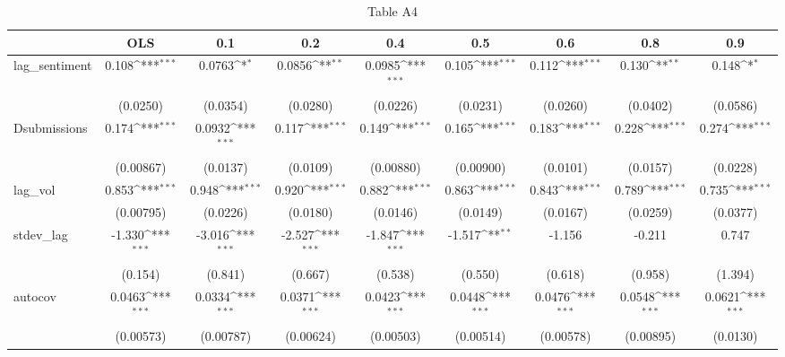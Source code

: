 \begin{table}[htbp]\centering
\def\sym#1{\ifmmode^{#1}\else\(^{#1}\)\fi}
\caption{Table A4}
\begin{tabular}{l*{8}{c}}
\toprule
                &\multicolumn{1}{c}{OLS}&\multicolumn{1}{c}{0.1}&\multicolumn{1}{c}{0.2}&\multicolumn{1}{c}{0.4}&\multicolumn{1}{c}{0.5}&\multicolumn{1}{c}{0.6}&\multicolumn{1}{c}{0.8}&\multicolumn{1}{c}{0.9}\\
\midrule
lag\_sentiment   &    0.108\sym{***}&   0.0763\sym{*}  &   0.0856\sym{**} &   0.0985\sym{***}&    0.105\sym{***}&    0.112\sym{***}&    0.130\sym{**} &    0.148\sym{*}  \\
                & (0.0250)         & (0.0354)         & (0.0280)         & (0.0226)         & (0.0231)         & (0.0260)         & (0.0402)         & (0.0586)         \\
\addlinespace
Dsubmissions    &    0.174\sym{***}&   0.0932\sym{***}&    0.117\sym{***}&    0.149\sym{***}&    0.165\sym{***}&    0.183\sym{***}&    0.228\sym{***}&    0.274\sym{***}\\
                &(0.00867)         & (0.0137)         & (0.0109)         &(0.00880)         &(0.00900)         & (0.0101)         & (0.0157)         & (0.0228)         \\
\addlinespace
lag\_vol         &    0.853\sym{***}&    0.948\sym{***}&    0.920\sym{***}&    0.882\sym{***}&    0.863\sym{***}&    0.843\sym{***}&    0.789\sym{***}&    0.735\sym{***}\\
                &(0.00795)         & (0.0226)         & (0.0180)         & (0.0146)         & (0.0149)         & (0.0167)         & (0.0259)         & (0.0377)         \\
\addlinespace
stdev\_lag       &   -1.330\sym{***}&   -3.016\sym{***}&   -2.527\sym{***}&   -1.847\sym{***}&   -1.517\sym{**} &   -1.156         &   -0.211         &    0.747         \\
                &  (0.154)         &  (0.841)         &  (0.667)         &  (0.538)         &  (0.550)         &  (0.618)         &  (0.958)         &  (1.394)         \\
\addlinespace
autocov         &   0.0463\sym{***}&   0.0334\sym{***}&   0.0371\sym{***}&   0.0423\sym{***}&   0.0448\sym{***}&   0.0476\sym{***}&   0.0548\sym{***}&   0.0621\sym{***}\\
                &(0.00573)         &(0.00787)         &(0.00624)         &(0.00503)         &(0.00514)         &(0.00578)         &(0.00895)         & (0.0130)         \\

\end{tabular}
\end{table}
